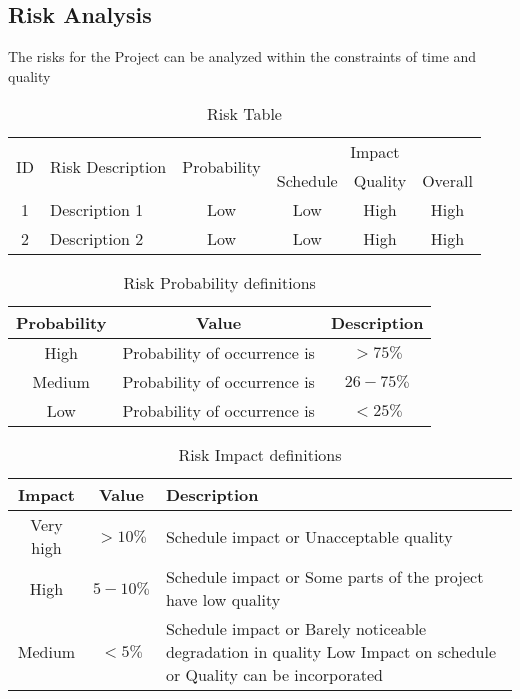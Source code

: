 \documentclass[oneside,a4paper,12pt]{book}
\begin{document}
\begin{enumerate}
\subsection{Risk Analysis}
The risks for the Project can be analyzed within the constraints of time and quality

\begin{table}[!htbp]
\begin{center}
\def\arraystretch{1.5}
\begin{tabularx}{\textwidth}{| c | X | c | c | c | c |}
\hline
\multirow{2}{*}{ID} & \multirow{2}{*}{Risk Description}	& \multirow{2}{*}{Probability} & \multicolumn{3}{|c|}{Impact} \\ \cline{4-6}
	& & &	Schedule	& Quality	& Overall \\ \hline
1	& Description 1	& Low	& Low	& High	& High \\ \hline
2	& Description 2	& Low	& Low	& High	& High \\ \hline
\end{tabularx}
\end{center}
\caption{Risk Table}
\label{tab:risk}
\end{table}


\begin{table}[!htbp]
\begin{center}
\def\arraystretch{1.5}
\begin{tabular}{| c | c | c |}
\hline
Probability & Value &	Description \\ \hline
High &	Probability of occurrence is &  $ > 75 \% $ \\ \hline
Medium &	Probability of occurrence is  & $26-75 \% $ \\ \hline
Low	& Probability of occurrence is & $ < 25 \% $ \\ \hline
\end{tabular}
\end{center}
\caption{Risk Probability definitions }
\label{tab:riskdef}
\end{table}

\begin{table}[!htbp]
\begin{center}
\def\arraystretch{1.5}
\begin{tabularx}{\textwidth}{| c | c | X |}
\hline
Impact & Value	& Description \\ \hline
Very high &	$> 10 \%$ & Schedule impact or Unacceptable quality \\ \hline
High &	$5-10 \%$ & Schedule impact or Some parts of the project have low quality \\ \hline
Medium	& $ < 5 \% $ & Schedule impact or Barely noticeable degradation in quality Low	Impact on schedule or Quality can be incorporated \\ \hline
\end{tabularx}
\end{center}
\caption{Risk Impact definitions }
\label{tab:riskImpactDef}
\end{table}


\end{enumerate}
\end{document}
